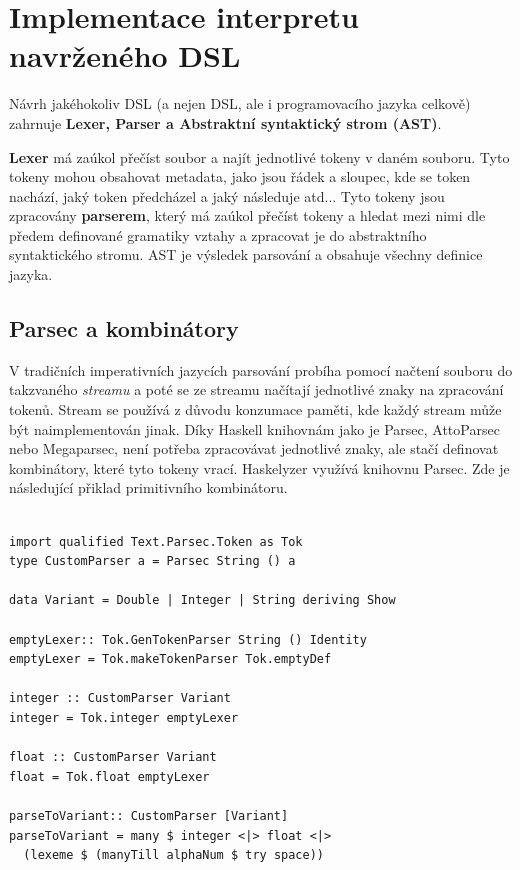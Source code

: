 \documentclass[male,czech]{kithesis}
\begin{document}

\chapter{Implementace interpretu navrženého DSL}

Návrh jakéhokoliv DSL (a nejen DSL, ale i programovacího jazyka celkově) zahrnuje
\textbf{Lexer, Parser a Abstraktní syntaktický strom (AST)}.

\textbf{Lexer} má zaúkol přečíst soubor a 
najít jednotlivé tokeny v daném souboru.
Tyto tokeny mohou obsahovat metadata, 
jako jsou řádek a sloupec, 
kde se token nachází,
jaký token předcházel a jaký následuje atd... 
Tyto tokeny jsou zpracovány \textbf{parserem}, 
který má zaúkol přečíst tokeny a 
hledat mezi nimi dle předem definované gramatiky vztahy a 
zpracovat je do abstraktního syntaktického stromu. 
AST je výsledek parsování a 
obsahuje všechny definice jazyka.

\section{Parsec a kombinátory}

V tradičních imperativních jazycích parsování probíha pomocí načtení souboru 
do takzvaného \textit{streamu} a 
poté se ze streamu načítají jednotlivé znaky na zpracování tokenů. 
Stream se používá z důvodu konzumace paměti, 
kde každý stream může být naimplementován jinak.
Díky Haskell knihovnám jako je Parsec, 
AttoParsec nebo Megaparsec,
není potřeba zpracovávat jednotlivé znaky, 
ale stačí definovat kombinátory, 
které tyto tokeny vrací. 
Haskelyzer využívá knihovnu Parsec. 
Zde je následující přiklad primitivního kombinátoru.

\begin{verbatim}

import qualified Text.Parsec.Token as Tok
type CustomParser a = Parsec String () a

data Variant = Double | Integer | String deriving Show

emptyLexer:: Tok.GenTokenParser String () Identity
emptyLexer = Tok.makeTokenParser Tok.emptyDef

integer :: CustomParser Variant 
integer = Tok.integer emptyLexer 

float :: CustomParser Variant 
float = Tok.float emptyLexer 

parseToVariant:: CustomParser [Variant]
parseToVariant = many $ integer <|> float <|> 
  (lexeme $ (manyTill alphaNum $ try space))

\end{verbatim}
\end{document}
